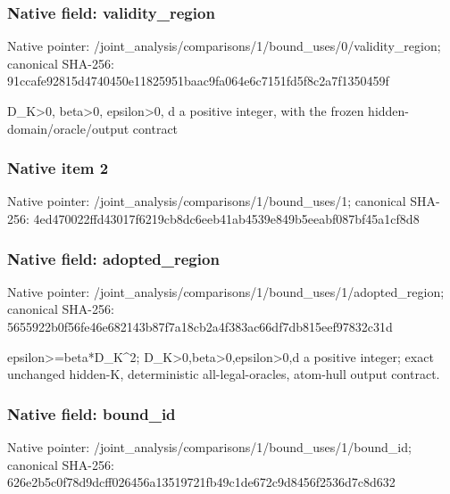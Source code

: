 \documentclass[10pt,a4paper]{article}
\begin{document}
\subsubsection{Native field: validity\_\allowbreak{}region}
Native pointer: /joint\_\allowbreak{}analysis/comparisons/1/bound\_\allowbreak{}uses/0/validity\_\allowbreak{}region; canonical SHA-256: 91ccafe92815d4740450e11825951baac9fa064e6c7151fd5f8c2a7f1350459f

\begingroup\raggedright\sloppy D\_\allowbreak{}K>0,\allowbreak{} beta>0,\allowbreak{} epsilon>0,\allowbreak{} d a positive integer,\allowbreak{} with the frozen hidden-domain/\allowbreak{}oracle/\allowbreak{}output contract\par\endgroup

\subsubsection{Native item 2}
Native pointer: /joint\_\allowbreak{}analysis/comparisons/1/bound\_\allowbreak{}uses/1; canonical SHA-256: 4ed470022ffd43017f6219cb8dc6eeb41ab4539e849b5eeabf087bf45a1cf8d8

\subsubsection{Native field: adopted\_\allowbreak{}region}
Native pointer: /joint\_\allowbreak{}analysis/comparisons/1/bound\_\allowbreak{}uses/1/adopted\_\allowbreak{}region; canonical SHA-256: 5655922b0f56fe46e682143b87f7a18cb2a4f383ac66df7db815eef97832c31d

\begingroup\raggedright\sloppy epsilon>=\allowbreak{}beta*D\_\allowbreak{}K\textasciicircum{}2;\allowbreak{} D\_\allowbreak{}K>0,\allowbreak{}beta>0,\allowbreak{}epsilon>0,\allowbreak{}d a positive integer;\allowbreak{} exact unchanged hidden-K,\allowbreak{} deterministic all-legal-oracles,\allowbreak{} atom-hull output contract.\par\endgroup

\subsubsection{Native field: bound\_\allowbreak{}id}
Native pointer: /joint\_\allowbreak{}analysis/comparisons/1/bound\_\allowbreak{}uses/1/bound\_\allowbreak{}id; canonical SHA-256: 626e2b5c0f78d9dcff026456a13519721fb49c1de672c9d8456f2536d7c8d632
\end{document}
